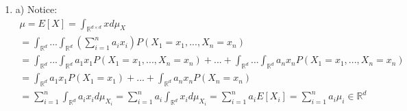\documentclass[12pt]{article}
\theoremstyle{plain}
\theoremstyle{definition}
\begin{document}
\begin{enumerate}
\item

 a) Notice:
 \begin{align*}
\mu = E[X] = \int_{\mathbb{R}^{d \times d}} x d\mu_X \\
= \int_{\mathbb{R}^d}...\int_{\mathbb{R}^d} (\sum_{i=1}^n a_i x_i) P(X_1=x_1, ..., X_n = x_n) \\
= \int_{\mathbb{R}^d}...\int_{\mathbb{R}^d}a_1x_1 P(X_1=x_1, ..., X_n = x_n) +... +\int_{\mathbb{R}^d}...\int_{\mathbb{R}^d}a_nx_n P(X_1=x_1, ..., X_n = x_n) \\ 
= \int_{\mathbb{R}^d}a_1x_1 P(X_1=x_1) +... +\int_{\mathbb{R}^d}a_nx_n P(X_n = x_n) \\
= \sum_{i=1}^n \int_{\mathbb{R}^d} a_i x_i d\mu_{X_i} 
= \sum_{i=1}^n a_i \int_{\mathbb{R}^d} x_i d\mu_{X_i} 
= \sum_{i=1}^n a_i E[X_i]
= \sum_{i=1}^n a_i \mu_i \in \mathbb{R}^d
 \end{align*}

\vspace{1pc}


\end{enumerate}
\end{document}
